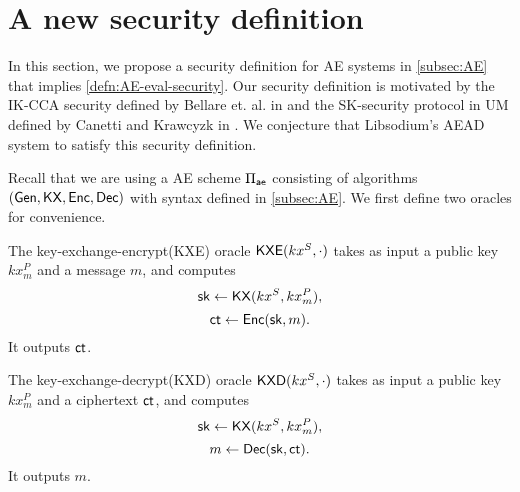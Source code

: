 \section{A new security definition}
\label{sec:IND-CCPKA}
In this section, we propose a security definition for AE systems in \cref{subsec:AE} that implies \cref{defn:AE-eval-security}. Our security definition is motivated by the IK-CCA security defined by Bellare et. al. in \cite{BBDP01keyprivate} and the SK-security protocol in UM defined by Canetti and Krawcyzk in \cite{CK2001keyexchange}. We conjecture that Libsodium's AEAD system to satisfy this security definition. 

Recall that we are using a AE scheme $\Pi_{\mathsf{ae}}$ consisting of algorithms $(\mathsf{Gen}, \mathsf{KX}, \mathsf{Enc}, \mathsf{Dec})$ with syntax defined in \cref{subsec:AE}. We first define two oracles for convenience.

\begin{definition}
\label{defn:AE-kxe-oracles}
The key-exchange-encrypt(KXE) oracle $\mathsf{KXE}(kx^S, \cdot)$ takes as input a public key $kx_m^P$ and a message $m$, and computes
$${\mathsf{sk}} \leftarrow \mathsf{KX}(kx^S, kx_m^P),$$
$$\mathsf{ct} \leftarrow \mathsf{Enc}({\mathsf{sk}}, m).$$
It outputs $\mathsf{ct}$.

The key-exchange-decrypt(KXD) oracle $\mathsf{KXD}(kx^S, \cdot)$ takes as input a public key $kx_m^P$ and a ciphertext $\mathsf{ct}$, and computes
$${\mathsf{sk}} \leftarrow \mathsf{KX}(kx^S, kx_m^P),$$
$$m \leftarrow \mathsf{Dec}({\mathsf{sk}}, \mathsf{ct}).$$
It outputs $m$.
\end{definition}


